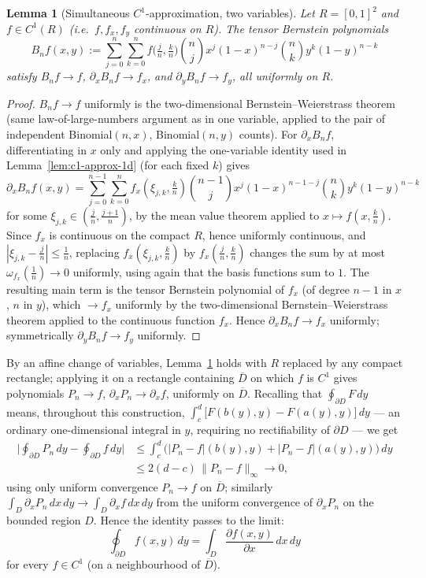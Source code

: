 \documentclass[11pt,fleqn]{article}
\theoremstyle{plain}
\newtheorem{lemma}[thm]{Lemma}
\theoremstyle{remark}
\begin{document}
\begin{lemma}[Simultaneous $C^1$-approximation, two variables]\label{lem:c1-approx-2d}
Let $R=[0,1]^2$ and $f\in C^1(R)$ (i.e.\ $f,f_x,f_y$ continuous on $R$).
The tensor Bernstein polynomials
\[
B_nf(x,y):=\sum_{j=0}^n\sum_{k=0}^nf\big(\tfrac jn,\tfrac kn\big)
\binom nj x^j(1-x)^{n-j}\binom nky^k(1-y)^{n-k}
\]
satisfy $B_nf\to f$, $\partial_xB_nf\to f_x$, and $\partial_yB_nf\to f_y$,
all uniformly on $R$.
\end{lemma}
\begin{proof}
$B_nf\to f$ uniformly is the two-dimensional Bernstein--Weierstrass
theorem (same law-of-large-numbers argument as in one variable, applied
to the pair of independent Binomial$(n,x)$, Binomial$(n,y)$ counts). For
$\partial_xB_nf$, differentiating in $x$ only and applying the
one-variable identity used in Lemma~\ref{lem:c1-approx-1d} (for each
fixed $k$) gives
\[
\partial_xB_nf(x,y)=\sum_{j=0}^{n-1}\sum_{k=0}^nf_x(\xi_{j,k},\tfrac kn)
\binom{n-1}jx^j(1-x)^{n-1-j}\binom nky^k(1-y)^{n-k}
\]
for some $\xi_{j,k}\in(\tfrac jn,\tfrac{j+1}n)$, by the mean value theorem
applied to $x\mapsto f(x,\tfrac kn)$. Since $f_x$ is continuous on the
compact $R$, hence uniformly continuous, and $|\xi_{j,k}-\tfrac
jn|\le\tfrac1n$, replacing $f_x(\xi_{j,k},\tfrac kn)$ by
$f_x(\tfrac jn,\tfrac kn)$ changes the sum by at most
$\omega_{f_x}(\tfrac1n)\to0$ uniformly, using again that the basis
functions sum to $1$. The resulting main term is the tensor Bernstein
polynomial of $f_x$ (of degree $n-1$ in $x$, $n$ in $y$), which $\to f_x$
uniformly by the two-dimensional Bernstein--Weierstrass theorem applied
to the continuous function $f_x$. Hence $\partial_xB_nf\to f_x$
uniformly; symmetrically $\partial_yB_nf\to f_y$ uniformly.
\end{proof}

By an affine change of variables, Lemma~\ref{lem:c1-approx-2d} holds with
$R$ replaced by any compact rectangle; applying it on a rectangle
containing $\overline D$ on which $f$ is $C^1$ gives polynomials
$P_n\to f$, $\partial_xP_n\to\partial_xf$, uniformly on $\overline D$.
Recalling that $\oint_{\partial D}F\,dy$ means, throughout this
construction, $\int_c^d\big[F(b(y),y)-F(a(y),y)\big]\,dy$ --- an ordinary
one-dimensional integral in $y$, requiring no rectifiability of
$\partial D$ --- we get
\begin{align*}
\Big|\oint_{\partial D}P_n\,dy-\oint_{\partial D}f\,dy\Big|
&\le\int_c^d\big(|P_n-f|(b(y),y)+|P_n-f|(a(y),y)\big)\,dy\\
&\le2(d-c)\,\|P_n-f\|_\infty\longrightarrow0,
\end{align*}
using only uniform convergence $P_n\to f$ on $\overline D$; similarly
$\int_D\partial_xP_n\,dx\,dy\to\int_D\partial_xf\,dx\,dy$ from the uniform
convergence of $\partial_xP_n$ on the bounded region $D$. Hence the
identity passes to the limit:
\[
\oint_{\partial D}f(x,y)\,dy=\int_D\frac{\partial f(x,y)}{\partial x}\,dx\,dy
\]
for every $f\in C^1$ (on a neighbourhood of $\overline D$).
\end{document}
